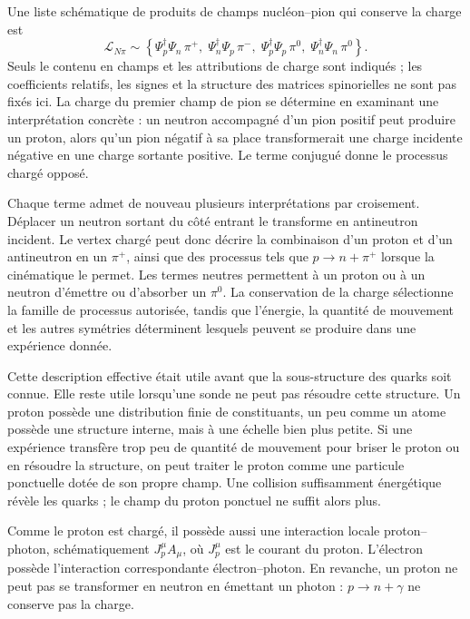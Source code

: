 Une liste schématique de produits de champs nucléon--pion qui conserve la charge est
\begin{equation}
\mathcal L_{N\pi}
\sim
\left\{
\Psi_p^\dagger\Psi_n\,\pi^+,\;
\Psi_n^\dagger\Psi_p\,\pi^-,\;
\Psi_p^\dagger\Psi_p\,\pi^0,\;
\Psi_n^\dagger\Psi_n\,\pi^0
\right\}.
\end{equation}
Seuls le contenu en champs et les attributions de charge sont indiqués ; les coefficients relatifs, les signes et la structure des matrices spinorielles ne sont pas fixés ici. La charge du premier champ de pion se détermine en examinant une interprétation concrète : un neutron accompagné d’un pion positif peut produire un proton, alors qu’un pion négatif à sa place transformerait une charge incidente négative en une charge sortante positive. Le terme conjugué donne le processus chargé opposé.

Chaque terme admet de nouveau plusieurs interprétations par croisement. Déplacer un neutron sortant du côté entrant le transforme en antineutron incident. Le vertex chargé peut donc décrire la combinaison d’un proton et d’un antineutron en un \(\pi^+\), ainsi que des processus tels que \(p\to n+\pi^+\) lorsque la cinématique le permet. Les termes neutres permettent à un proton ou à un neutron d’émettre ou d’absorber un \(\pi^0\). La conservation de la charge sélectionne la famille de processus autorisée, tandis que l’énergie, la quantité de mouvement et les autres symétries déterminent lesquels peuvent se produire dans une expérience donnée.

Cette description effective était utile avant que la sous-structure des quarks soit connue. Elle reste utile lorsqu’une sonde ne peut pas résoudre cette structure. Un proton possède une distribution finie de constituants, un peu comme un atome possède une structure interne, mais à une échelle bien plus petite. Si une expérience transfère trop peu de quantité de mouvement pour briser le proton ou en résoudre la structure, on peut traiter le proton comme une particule ponctuelle dotée de son propre champ. Une collision suffisamment énergétique révèle les quarks ; le champ du proton ponctuel ne suffit alors plus.

Comme le proton est chargé, il possède aussi une interaction locale proton--photon, schématiquement \(J_p^\mu A_\mu\), où \(J_p^\mu\) est le courant du proton. L’électron possède l’interaction correspondante électron--photon. En revanche, un proton ne peut pas se transformer en neutron en émettant un photon : \(p\to n+\gamma\) ne conserve pas la charge.

